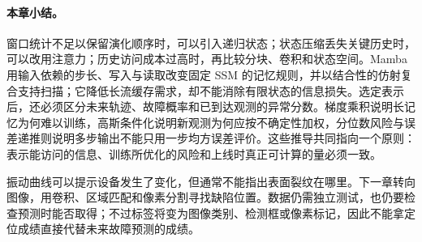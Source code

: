 \paragraph{本章小结。}
窗口统计不足以保留演化顺序时，可以引入递归状态；状态压缩丢失关键历史时，可以改用注意力；历史访问成本过高时，再比较分块、卷积和状态空间。Mamba 用输入依赖的步长、写入与读取改变固定 SSM 的记忆规则，并以结合性的仿射复合支持扫描；它降低长流缓存需求，却不能消除有限状态的信息损失。选定表示后，还必须区分未来轨迹、故障概率和已到达观测的异常分数。梯度乘积说明长记忆为何难以训练，高斯条件化说明新观测为何应按不确定性加权，分位数风险与误差递推则说明多步输出不能只用一步均方误差评价。这些推导共同指向一个原则：表示能访问的信息、训练所优化的风险和上线时真正可计算的量必须一致。

振动曲线可以提示设备发生了变化，但通常不能指出表面裂纹在哪里。下一章转向图像，用卷积、区域匹配和像素分割寻找缺陷位置。数据仍需独立测试，也仍要检查预测时能否取得；不过标签将变为图像类别、检测框或像素标记，因此不能拿定位成绩直接代替未来故障预测的成绩。
